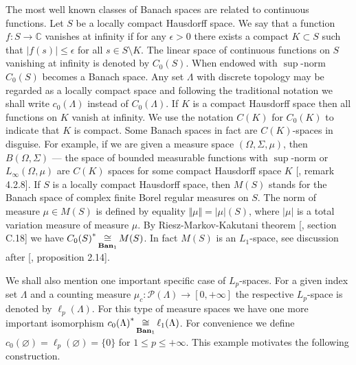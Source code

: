 The most well known classes of Banach spaces are related to continuous
functions. Let $S$ be a locally compact Hausdorff space. We say that a function
$f:S\to\mathbb{C}$ vanishes at infinity  if for any $\epsilon>0$ there exists a
compact $K\subset S$ such that $|f(s)|\leq\epsilon$ for all $s\in S\setminus K$.
The linear space of continuous functions on $S$ vanishing at infinity is denoted
by $C_0(S)$. When endowed with $\sup$-norm $C_0(S)$ becomes a Banach space. Any
set $\Lambda$ with discrete topology may be regarded as a locally compact space
and following the traditional notation we shall write $c_0(\Lambda)$ instead of
$C_0(\Lambda)$. If $K$ is a compact Hausdorff space then all functions on $K$
vanish at infinity. We use the notation $C(K)$ for $C_0(K)$ to indicate that $K$
is compact. Some Banach spaces in fact are $C(K)$-spaces in disguise. For
example, if we are given a measure space $(\Omega,\Sigma,\mu)$, then
$B(\Omega,\Sigma)$ --- the space of bounded measurable functions with
$\sup$-norm or $L_\infty(\Omega,\mu)$ are $C(K)$ spaces for some compact
Hausdorff space $K$ [\cite{KalAlbTopicsBanSpTh}, remark 4.2.8]. If $S$ is a
locally compact Hausdorff space, then $M(S)$ stands for the Banach space of
complex finite Borel regular measures on $S$. The norm of measure $\mu\in M(S)$
is defined by equality $\Vert\mu\Vert=|\mu|(S)$, where $|\mu|$ is a total
variation measure of measure $\mu$. By Riesz-Markov-Kakutani theorem
[\cite{ConwACoursInFuncAn}, section C.18] we have
${C_0(S)}^*\mathop{\mathbin{\cong}}\limits_{\mathbf{Ban}_1}M(S)$. In fact $M(S)$ is an $L_1$-space, see
discussion after [\cite{DalLauSecondDualOfMeasAlg}, proposition 2.14]. 

We shall also mention one important specific case of $L_p$-spaces. For a given
index set $\Lambda$ and a counting measure
$\mu_c:\mathcal{P}(\Lambda)\to[0,+\infty]$ the respective $L_p$-space is denoted
by $\ell_p(\Lambda)$. For this type of measure spaces we have one more important
isomorphism ${c_0(\Lambda)}^*\mathop{\mathbin{\cong}}\limits_{\mathbf{Ban}_1}\ell_1(\Lambda)$. For
convenience we define $c_0(\varnothing)=\ell_p(\varnothing)= \{0 \}$ for 
$1\leq p\leq+\infty$. This example motivates the following construction.

